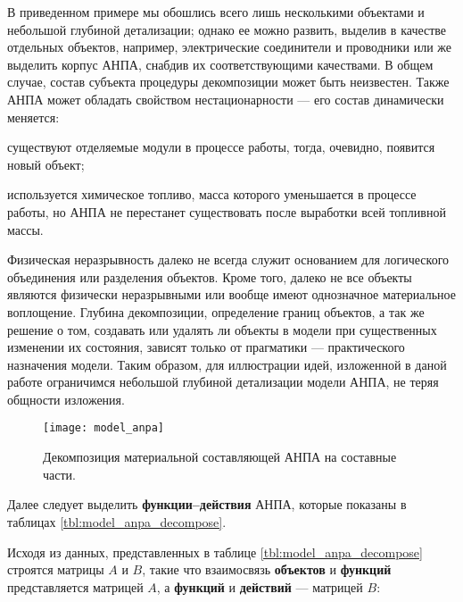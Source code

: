 В приведенном примере мы обошлись всего лишь несколькими объектами и небольшой глубиной детализации;
однако ее можно развить, выделив в качестве отдельных объектов, например, электрические соединители и проводники
или же выделить корпус АНПА, снабдив их соответствующими качествами.
В общем случае, состав субъекта процедуры декомпозиции может быть неизвестен.
Также АНПА может обладать свойством нестационарности --- его состав динамически меняется:
\begin{enumerate*}[label=\itshape\alph*\upshape)]
\item  существуют отделяемые модули в процессе работы, тогда, очевидно, появится новый объект;
\item используется химическое топливо, масса которого уменьшается в процессе работы,
   но АНПА не перестанет существовать после выработки всей топливной массы.
\end{enumerate*}
Физическая неразрывность далеко не всегда служит основанием для логического объединения или разделения объектов.
Кроме того, далеко не все объекты являются физически неразрывными или вообще имеют однозначное материальное воплощение.
%
Глубина декомпозиции, определение границ объектов, а так же решение о том, создавать или удалять ли объекты в модели
при существенных изменении их состояния, зависят только от прагматики --- практического назначения модели.
Таким образом, для иллюстрации идей, изложенной в даной работе ограничимся небольшой глубиной детализации модели АНПА,
не теряя общности изложения.

\begin{center}
    \begin{figure}[ht]
        \texttt{[image: model\_anpa]}
        \caption{Декомпозиция материальной составляющей АНПА на составные части.}
            \label{fig:model_anpa}
    \end{figure}
\end{center}

Далее следует выделить \textbf{функции--действия} АНПА, которые показаны в таблицах
\ref{tbl:model_anpa_decompose}.



Исходя из данных, представленных в таблице \ref{tbl:model_anpa_decompose}
строятся матрицы $A$ и $B$, такие что
взаимосвязь \textbf{объектов} и \textbf{функций} представляется матрицей $A$,
а \textbf{функций} и \textbf{действий} --- матрицей $B$:

